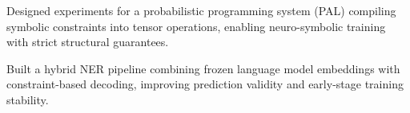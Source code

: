     \vspace{0.10 cm}
    \begin{onecolentry}
        \begin{highlights}
    
    \item Designed experiments for a probabilistic programming system (PAL) compiling symbolic constraints into tensor operations, enabling neuro-symbolic training with strict structural guarantees.
    \item Built a hybrid NER pipeline combining frozen language model embeddings with constraint-based decoding, improving prediction validity and early-stage training stability.
        
        \end{highlights}
    \end{onecolentry}
